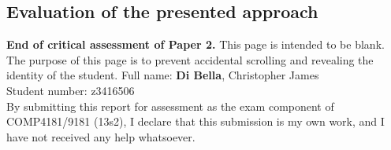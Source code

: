 \documentclass[9pt]{report}
\begin{document}
\subsection*{Evaluation of the presented approach}

\noindent
{\bf End of critical assessment of Paper 2.}
\clearpage
\noindent
This page is intended to be blank.\\

\noindent
The purpose of this page is to prevent accidental scrolling and revealing the identity of the student.
\clearpage
\noindent
Full name: \hspace{8mm} {\bf Di Bella}, Christopher James\\
Student number: z3416506\\

\noindent
By submitting this report for assessment as the exam component of COMP4181/9181 (13s2), I declare that this submission is my own work, and I have not received any help whatsoever.
\end{document}
